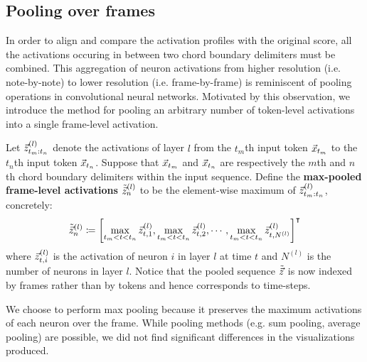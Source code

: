 \documentclass[dissertation.tex]{subfiles}
\begin{document}
\subsection{Pooling over frames}

In order to align and compare the activation profiles with the original score,
all the activations occuring in between two chord boundary delimiters must be
combined. This aggregation of neuron activations from higher resolution (i.e.
note-by-note) to lower resolution (i.e. frame-by-frame) is reminiscent of
pooling operations in convolutional neural networks. Motivated by
this observation, we introduce the method for pooling an arbitrary number of
token-level activations into a single frame-level activation.

Let $\vec{z}^{(l)}_{{t_m}:{t_n}}$ denote the activations of layer $l$ from the $t_m$th input token $\vec{x}_{t_m}$
to the $t_n$th input token $\vec{x}_{t_n}$. Suppose that $\vec{x}_{t_m}$ and $\vec{x}_{t_n}$ are respectively the
$m$th and $n$th chord boundary delimiters within the input sequence. Define the
\textbf{max-pooled frame-level activations} $\tilde{\vec{z}}^{(l)}_n$ to be the
element-wise maximum of $\vec{z}^{(l)}_{{t_m}:{t_n}}$, concretely:
\begin{equation}
    \tilde{\vec{z}}^{(l)}_n \coloneqq \left[
        \max_{t_m < t < t_n} \vec{z}^{(l)}_{t,1},
        \max_{t_m < t < t_n} \vec{z}^{(l)}_{t,2},
        \cdots,
        \max_{t_m < t < t_n} \vec{z}^{(l)}_{t,N^{(l)}}
    \right]^\intercal
\end{equation}
where $\vec{z}^{(l)}_{t,i}$ is the activation of neuron $i$ in layer $l$ at time $t$
and $N^{(l)}$ is the number of neurons in layer $l$. Notice that the pooled
sequence $\tilde{\vec{z}}$ is now indexed by frames rather than by tokens and hence
corresponds to time-steps.

We choose to perform max pooling because it preserves the maximum activations
of each neuron over the frame. While pooling methods (e.g. sum pooling, average
pooling) are possible, we did not find significant differences in the
visualizations produced.
\end{document}
